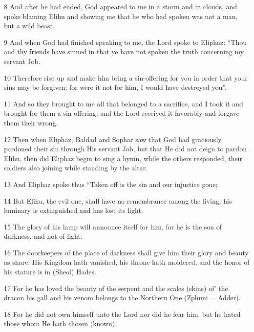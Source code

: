 \par 8 And after he had ended, God appeared to me in a storm and in clouds, and spoke blaming Elihu and showing me that he who had spoken was not a man, but a wild beast.

\par 9 And when God had finished speaking to me, the Lord spoke to Eliphaz: “Thou and thy friends have sinned in that ye have not spoken the truth concerning my servant Job.

\par 10 Therefore rise up and make him bring a sin-offering for you in order that your sins may be forgiven; for were it not for him, I would have destroyed you”.

\par 11 And so they brought to me all that belonged to a sacrifice, and I took it and brought for them a sin-offering, and the Lord received it favorably and forgave them their wrong.

\par 12 Then when Eliphaz, Baldad and Sophar saw that God had graciously pardoned their sin through His servant Job, but that He did not deign to pardon Elihu, then did Eliphaz begin to sing a hymn, while the others responded, their soldiers also joining while standing by the altar.

\par 13 And Eliphaz spoke thus “Taken off is the sin and our injustice gone;

\par 14 But Elihu, the evil one, shall have no remembrance among the living; his luminary is extinguished and has lost its light.

\par 15 The glory of his lamp will announce itself for him, for he is the son of darkness. and not of light.

\par 16 The doorkeepers of the place of darkness shall give him their glory and beauty as share; His Kingdom hath vanished, his throne hath moldered, and the honor of his stature is in (Sheol) Hades.

\par 17 For he has loved the beauty of the serpent and the scales (skins) of’ the dracon his gall and his venom belongs to the Northern One (Zphuni = Adder).

\par 18 For he did not own himself unto the Lord nor did he fear him, but he hated those whom He hath chosen (known).

